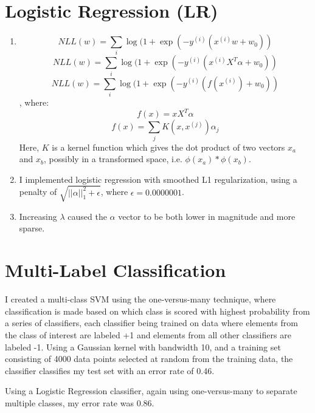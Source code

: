 \documentclass{paper}
\begin{document}
\section{Logistic Regression (LR)}

\begin{enumerate}
    \item
    \[ NLL(w) = \sum_i \log(1 + \exp(-y^{(i)} (x^{(i)} w + w_0)  ) \]
    \[ NLL(w) = \sum_i \log(1 + \exp(-y^{(i)} (x^{(i)} X^T \alpha + w_0)  ) \]
    \[ NLL(w) = \sum_i \log(1 + \exp(-y^{(i)} (f(x^{(i)}) + w_0)  ) \], where:
    \[ f(x) = x X^T \alpha \]
    \[ f(x) = \sum_j K(x, x^{(j)}) \alpha_j \]
    Here, $K$ is a kernel function which gives the dot product of two vectors $x_a$ and $x_b$, possibly in a transformed space, i.e. $\phi(x_a)*\phi(x_b)$.

    \item
        I implemented logistic regression with smoothed L1 regularization, using a penalty of $\sqrt{||\alpha||_1^2 + \epsilon}$, where $\epsilon = 0.0000001$.

    \item
        Increasing $\lambda$ caused the $\alpha$ vector to be both lower in magnitude and more sparse.

\end{enumerate}

\section{Multi-Label Classification}

I created a multi-class SVM using the one-versus-many technique, where classification is made based on which class is scored with highest probability from a series of classifiers, each classifier being trained on data where elements from the class of interest are labeled +1 and elements from all other classifiers are labeled -1. Using a Gaussian kernel with bandwidth 10, and a training set consisting of 4000 data points selected at random from the training data, the classifier classifies my test set with an error rate of 0.46. 

Using a Logistic Regression classifier, again using one-versus-many to separate multiple classes, my error rate was 0.86.
\end{document}
